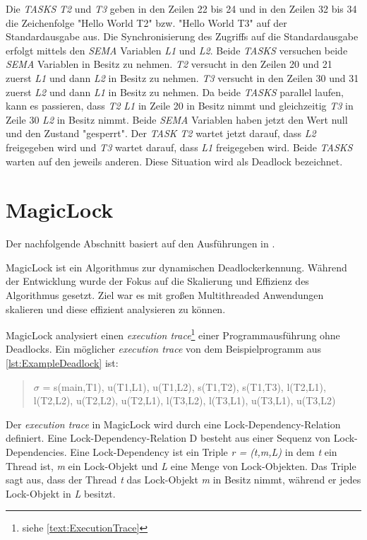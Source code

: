 Die \textit{TASKS} \textit{T2} und \textit{T3} geben in den Zeilen 22 bis 24 und
in den Zeilen 32 bis 34 die Zeichenfolge "Hello World T2" bzw. "Hello World T3"
auf der Standardausgabe aus. Die Synchronisierung des Zugriffs auf die
Standardausgabe erfolgt mittels den \textit{SEMA} Variablen \textit{L1} und
\textit{L2}. Beide \textit{TASKS} versuchen beide \textit{SEMA} Variablen in
Besitz zu nehmen. \textit{T2} versucht in den Zeilen 20 und 21 zuerst
\textit{L1} und dann \textit{L2} in Besitz zu nehmen. \textit{T3} versucht in
den Zeilen 30 und 31 zuerst \textit{L2} und dann \textit{L1} in Besitz zu
nehmen. Da beide \textit{TASKS} parallel laufen, kann es passieren, dass
\textit{T2} \textit{L1} in Zeile 20 in Besitz nimmt und gleichzeitig \textit{T3}
in Zeile 30 \textit{L2} in Besitz nimmt. Beide \textit{SEMA} Variablen haben
jetzt den Wert null und den Zustand "gesperrt". Der \textit{TASK} \textit{T2}
wartet jetzt darauf, dass \textit{L2} freigegeben wird und \textit{T3} wartet
darauf, dass \textit{L1} freigegeben wird. Beide \textit{TASKS} warten auf den
jeweils anderen. Diese Situation wird als Deadlock bezeichnet.

\section{MagicLock}
\label{section:MagicLock}
Der nachfolgende Abschnitt basiert auf den Ausführungen in \autocite{MagicLock}.

MagicLock ist ein Algorithmus zur dynamischen Deadlockerkennung. Während der
Entwicklung wurde der Fokus auf die Skalierung und Effizienz des Algorithmus
gesetzt. Ziel war es mit großen Multithreaded Anwendungen skalieren und diese
effizient analysieren zu können.

MagicLock analysiert einen \textit{execution trace}\footnote{siehe
\cref{text:ExecutionTrace}} einer Programmausführung ohne Deadlocks. Ein
möglicher \textit{execution trace} von dem Beispielprogramm aus
\cref{lst:ExampleDeadlock} ist:
\begin{quote}
  \textbf{$\sigma$} = s(main,T1), u(T1,L1), u(T1,L2), s(T1,T2), s(T1,T3),
  l(T2,L1), l(T2,L2), u(T2,L2), u(T2,L1), l(T3,L2), l(T3,L1), u(T3,L1), u(T3,L2)
\end{quote}
Der \textit{execution trace} in MagicLock wird durch eine
Lock-Dependency-Relation definiert. Eine Lock-Dependency-Relation D besteht aus
einer Sequenz von Lock-Dependencies. Eine Lock-Dependency ist ein Triple
\textit{r = (t,m,L)} in dem \textit{t} ein Thread ist, \textit{m} ein
Lock-Objekt und \textit{L} eine Menge von Lock-Objekten. Das Triple sagt aus,
dass der Thread \textit{t} das Lock-Objekt \textit{m} in Besitz nimmt, während
er jedes Lock-Objekt in \textit{L} besitzt.

